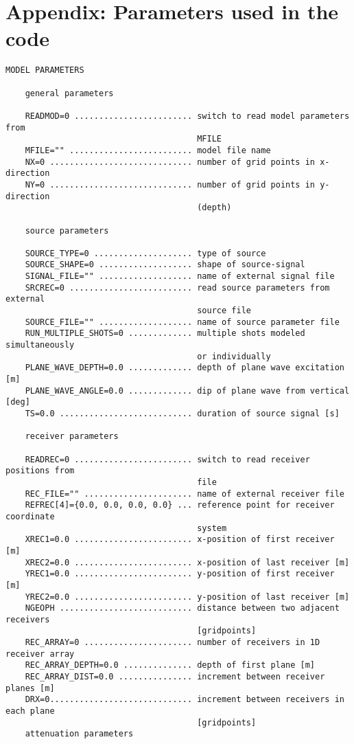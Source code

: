 \section{Appendix: Parameters used in the code}
\label{parameters}

\begin{verbatim}
MODEL PARAMETERS
    
    general parameters
    
    READMOD=0 ........................ switch to read model parameters from
                                       MFILE
    MFILE="" ......................... model file name
    NX=0 ............................. number of grid points in x-direction
    NY=0 ............................. number of grid points in y-direction
                                       (depth)
    
    source parameters
    
    SOURCE_TYPE=0 .................... type of source
    SOURCE_SHAPE=0 ................... shape of source-signal
    SIGNAL_FILE="" ................... name of external signal file
    SRCREC=0 ......................... read source parameters from external
                                       source file
    SOURCE_FILE="" ................... name of source parameter file
    RUN_MULTIPLE_SHOTS=0 ............. multiple shots modeled simultaneously
                                       or individually
    PLANE_WAVE_DEPTH=0.0 ............. depth of plane wave excitation [m]
    PLANE_WAVE_ANGLE=0.0 ............. dip of plane wave from vertical [deg]
    TS=0.0 ........................... duration of source signal [s]
    
    receiver parameters
    
    READREC=0 ........................ switch to read receiver positions from
                                       file
    REC_FILE="" ...................... name of external receiver file
    REFREC[4]={0.0, 0.0, 0.0, 0.0} ... reference point for receiver coordinate 
                                       system
    XREC1=0.0 ........................ x-position of first receiver [m]
    XREC2=0.0 ........................ x-position of last receiver [m]
    YREC1=0.0 ........................ y-position of first receiver [m]
    YREC2=0.0 ........................ y-position of last receiver [m]
    NGEOPH ........................... distance between two adjacent receivers 
                                       [gridpoints]
    REC_ARRAY=0 ...................... number of receivers in 1D receiver array
    REC_ARRAY_DEPTH=0.0 .............. depth of first plane [m] 
    REC_ARRAY_DIST=0.0 ............... increment between receiver planes [m]
    DRX=0............................. increment between receivers in each plane 
                                       [gridpoints]
    attenuation parameters
    

\end{verbatim}

